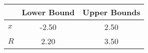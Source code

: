 \begin{tiny}\begin{tabular}{|l|c|c|}
\hline
&\textbf{Lower Bound}&\textbf{Upper Bounds}\\\hline
\textbf{$x$}&-2.50&2.50\\\hline
\textbf{$R$}&2.20&3.50\\\hline
\end{tabular}
\end{tiny}